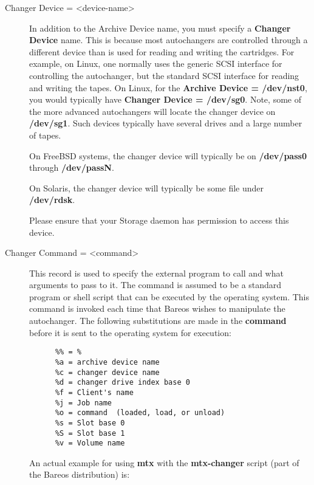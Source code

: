 \begin{description}


\item [Changer Device = {\textless}device-name{\textgreater}]
   In addition to the Archive Device name, you must specify a  {\bf Changer
Device} name. This is because most autochangers are  controlled through a
different device than is used for reading and  writing the cartridges. For
example, on Linux, one normally uses the generic SCSI interface for
controlling the autochanger, but the standard SCSI interface for reading and
writing the  tapes. On Linux, for the {\bf Archive Device = /dev/nst0},  you
would typically have {\bf Changer Device = /dev/sg0}.  Note, some of the more
advanced autochangers will locate the changer device on {\bf /dev/sg1}. Such
devices typically have  several drives and a large number of tapes.

On FreeBSD systems, the changer device will typically be on {\bf /dev/pass0}
through {\bf /dev/passN}.

On Solaris, the changer device will typically be some file under {\bf
/dev/rdsk}.

Please ensure that your Storage daemon has permission to access this
device.

\item [Changer Command = {\textless}command{\textgreater}]
   This record is used to specify the external program to call  and what
arguments to pass to it. The command is assumed to be  a standard program or
shell script that can be executed by  the operating system. This command is
invoked each time that Bareos wishes to manipulate the autochanger.  The
following substitutions are made in the {\bf command}  before it is sent to
the operating system for execution:

\footnotesize
\begin{verbatim}
      %% = %
      %a = archive device name
      %c = changer device name
      %d = changer drive index base 0
      %f = Client's name
      %j = Job name
      %o = command  (loaded, load, or unload)
      %s = Slot base 0
      %S = Slot base 1
      %v = Volume name
\end{verbatim}
\normalsize

An actual example for using {\bf mtx} with the  {\bf mtx-changer} script (part
of the Bareos distribution) is:


\end{description}
